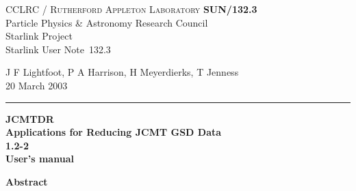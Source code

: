 \documentclass[twoside,11pt]{article}
\newcommand{\stardoccategory}  {Starlink User Note}
\newcommand{\stardocinitials}  {SUN}
\newcommand{\stardocnumber}    {132.3}
\newcommand{\stardocauthors}
   {J F Lightfoot, P A Harrison, H Meyerdierks, T Jenness}
\newcommand{\stardocdate}      {20 March 2003}
\newcommand{\stardoctitle}     {JCMTDR \\[2ex] Applications for Reducing JCMT GSD Data}
\newcommand{\stardocversion}   {1.2-2}
\newcommand{\stardocmanual}    {User's manual}
\newcommand{\stardocname}{\stardocinitials /\stardocnumber}
\newenvironment{latexonly}{}{}
\renewcommand{\_}{\texttt{\symbol{95}}}
\begin{document}
\thispagestyle{empty}

\begin{latexonly}
   CCLRC / \textsc{Rutherford Appleton Laboratory} \hfill \textbf{\stardocname}\\
   {\large Particle Physics \& Astronomy Research Council}\\
   {\large Starlink Project\\}
   {\large \stardoccategory\ \stardocnumber}
   \begin{flushright}
   \stardocauthors\\
   \stardocdate
   \end{flushright}
   \vspace{-4mm}
   \rule{\textwidth}{0.5mm}
   \vspace{5mm}
   \begin{center}
   {\Huge\textbf{\stardoctitle \\ [2.5ex]}}
   {\LARGE\textbf{\stardocversion \\ [4ex]}}
   {\Huge\textbf{\stardocmanual}}
   \end{center}
   \vspace{5mm}



   \vspace{10mm}
   \begin{center}
      {\Large\textbf{Abstract}}
   \end{center}
\end{latexonly}
\end{document}
